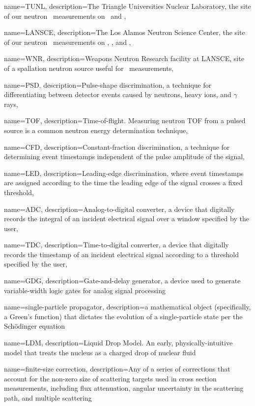 {
    name={TUNL},
    description={The Triangle Universities Nuclear Laboratory, the site of our neutron \el\ 
        measurements on \snTwelve\ and \snFour},
}

{
    name={LANSCE},
    description={The Los Alamos Neutron Science Center, the site of our neutron \tot\ measurements on
    \oSixEight, \niEightFour, and \snTwelveFour},
}

{
    name={WNR},
    description={Weapons Neutron Research facility at LANSCE, site of a spallation neutron source
    useful for \tot\ measurements},
}

{
    name={PSD},
    description={Pulse-shape discrimination, a technique for differentiating between detector events
    caused by neutrons, heavy ions, and $\gamma$ rays},
}

{
    name={TOF},
    description={Time-of-flight. Measuring neutron TOF from a pulsed source is a common
    neutron energy determination technique},
}

{
    name={CFD},
    description={Constant-fraction discrimination, a technique for determining event timestamps
    independent of the pulse amplitude of the signal},
}

{
    name={LED},
    description={Leading-edge discrimination, where event timestamps are assigned according to the
    time the leading edge of the signal crosses a fixed threshold},
}

{
    name={ADC},
    description={Analog-to-digital converter, a device that digitally records the integral of an 
    incident electrical signal over a window specified by the user},
}

{
    name={TDC},
    description={Time-to-digital converter, a device that digitally records the timestamp of an
    incident electrical signal according to a threshold specified by the user},
}

{
    name={GDG},
    description={Gate-and-delay generator, a device used to generate
    variable-width logic gates for analog signal processing}
}

{
    name={single-particle propagator},
    description={a mathematical object (specifically, a Green's function) that dictates the 
    evolution of a single-particle state per the Sch\"odinger equation}
}

{
    name={LDM},
    description={Liquid Drop Model. An early, physically-intuitive model that treats the
    nucleus as a charged drop of nuclear fluid}
}

{
    name={finite-size correction},
    description={Any of a series of corrections that account for the
    non-zero size of scattering targets used in cross section measurements,
    including flux attenuation, angular uncertainty in the scattering path, and
    multiple scattering}
}
